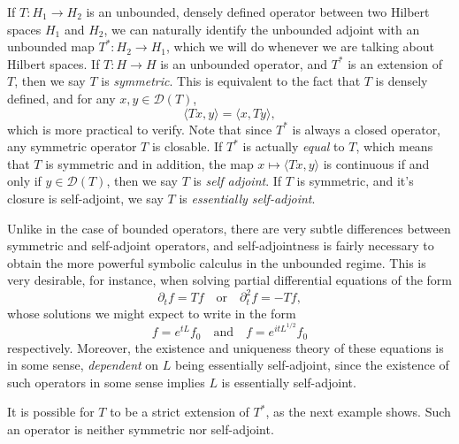If $T: H_1 \to H_2$ is an unbounded, densely defined operator between two Hilbert spaces $H_1$ and $H_2$, we can naturally identify the unbounded adjoint with an unbounded map $T^*: H_2 \to H_1$, which we will do whenever we are talking about Hilbert spaces. If $T: H \to H$ is an unbounded operator, and $T^*$ is an extension of $T$, then we say $T$ is \emph{symmetric}. This is equivalent to the fact that $T$ is densely defined, and for any $x,y \in \mathcal{D}(T)$,
%
\[ \langle Tx, y \rangle = \langle x, Ty \rangle, \]
%
which is more practical to verify. Note that since $T^*$ is always a closed operator, any symmetric operator $T$ is closable. If $T^*$ is actually \emph{equal} to $T$, which means that $T$ is symmetric and in addition, the map $x \mapsto \langle Tx, y \rangle$ is continuous if and only if $y \in \mathcal{D}(T)$, then we say $T$ is \emph{self adjoint}. If $T$ is symmetric, and it's closure is self-adjoint, we say $T$ is \emph{essentially self-adjoint}.

Unlike in the case of bounded operators, there are very subtle differences between symmetric and self-adjoint operators, and self-adjointness is fairly necessary to obtain the more powerful symbolic calculus in the unbounded regime. This is very desirable, for instance, when solving partial differential equations of the form
%
\[ \partial_t f = Tf \quad\text{or}\quad \partial_t^2 f = - Tf, \]
%
whose solutions we might expect to write in the form
%
\[ f = e^{tL} f_0 \quad\text{and}\quad f = e^{itL^{1/2}} f_0 \]
%
respectively. Moreover, the existence and uniqueness theory of these equations is in some sense, \emph{dependent} on $L$ being essentially self-adjoint, since the existence of such operators in some sense implies $L$ is essentially self-adjoint.

It is possible for $T$ to be a strict extension of $T^*$, as the next example shows. Such an operator is neither symmetric nor self-adjoint.

